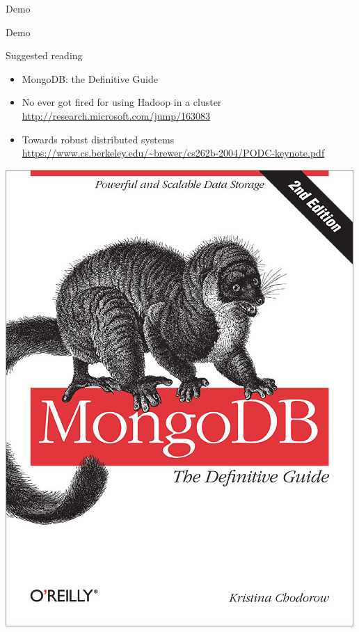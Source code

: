 \documentclass{beamer}
\begin{document}
\begin{frame}%

\begin{center}
   Demo
\end{center}

\end{frame}


\begin{frame}%

\begin{center}
   Demo
\end{center}

\end{frame}


\begin{frame}{Suggested reading}

\begin{itemize}
\item MongoDB: the Definitive Guide
\item No ever got fired for using Hadoop in a cluster \url{http://research.microsoft.com/jump/163083}
\item Towards robust distributed systems \url{https://www.cs.berkeley.edu/~brewer/cs262b-2004/PODC-keynote.pdf}
\end{itemize}

\begin{center}
\includegraphics[scale=0.75]{mongo-cover.jpg}
\end{center}

\end{frame}
\end{document}
